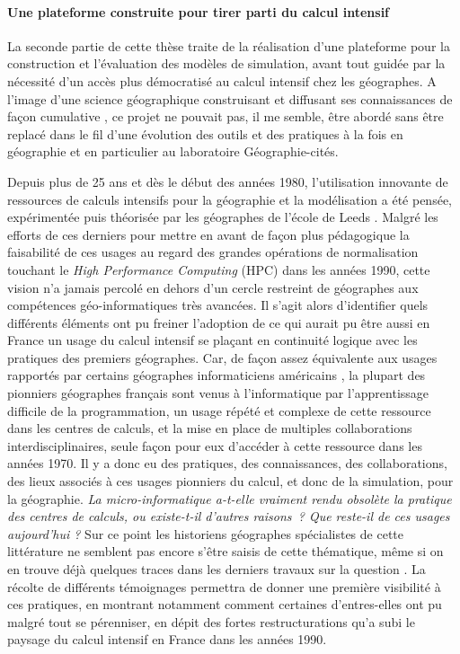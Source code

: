 \paragraph*{Une plateforme construite pour tirer parti du calcul intensif}

La seconde partie de cette thèse traite de la réalisation d'une plateforme pour la construction et l'évaluation des modèles de simulation, avant tout guidée par la nécessité d'un accès plus démocratisé au calcul intensif chez les géographes. A l'image d'une science géographique construisant et diffusant ses connaissances de façon cumulative \autocite{Pumain2003,Pumain2005}
⁠, ce projet ne pouvait pas, il me semble, être abordé sans être replacé dans le fil d'une évolution des outils et des pratiques à la fois en géographie et en particulier au laboratoire Géographie-cités.

Depuis plus de 25 ans et dès le début des années 1980, l'utilisation innovante de ressources de calculs intensifs pour la géographie et la modélisation a été pensée, expérimentée puis théorisée par les géographes de l'école de Leeds \autocites{Openshaw2000b,Openshaw2000, Openshaw1983,Openshaw1988,Turton1996,Turton1998, Diplock1996}⁠. Malgré les efforts de ces derniers pour mettre en avant de façon plus pédagogique \autocite{Openshaw2000} la faisabilité de ces usages au regard des grandes opérations de normalisation touchant le\textit{ High Performance Computing} (HPC) dans les années 1990, cette vision n'a jamais percolé en dehors d'un cercle restreint de géographes aux compétences géo-informatiques très avancées. Il s'agit alors d'identifier quels différents éléments ont pu freiner l'adoption de ce qui aurait pu être aussi en France un usage du calcul intensif se plaçant en continuité logique avec les pratiques des premiers géographes. Car, de façon assez équivalente aux usages rapportés par certains géographes informaticiens américains \autocite{Marble2010}, la plupart des pionniers géographes français sont venus à l'informatique par l'apprentissage difficile de la programmation, un usage répété et complexe de cette ressource dans les centres de calculs, et la mise en place de multiples collaborations interdisciplinaires, seule façon pour eux d'accéder à cette ressource dans les années 1970. Il y a donc eu des pratiques, des connaissances, des collaborations, des lieux associés à ces usages pionniers du calcul, et donc de la simulation, pour la géographie. \textit{La micro-informatique a-t-elle vraiment rendu obsolète la pratique des centres de calculs, ou existe-t-il d'autres raisons ? Que reste-il de ces usages aujourd'hui ?} Sur ce point les historiens géographes spécialistes de cette littérature ne semblent pas encore s'être saisis de cette thématique, même si on en trouve déjà quelques traces dans les derniers travaux sur la question \autocite{Cuyala2014}⁠. La récolte de différents témoignages permettra de donner une première visibilité à ces pratiques, en montrant notamment comment certaines d'entres-elles ont pu malgré tout se pérenniser, en dépit des fortes restructurations qu'a subi le paysage du calcul intensif en France dans les années 1990.

